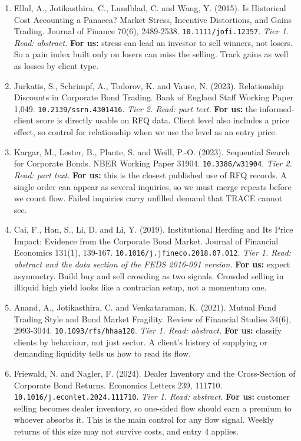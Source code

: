 \begin{enumerate}[leftmargin=*,itemsep=3pt]
\item Ellul, A., Jotikasthira, C., Lundblad, C. and Wang, Y. (2015). Is Historical Cost Accounting a Panacea? Market Stress, Incentive Distortions, and Gains Trading. Journal of Finance 70(6), 2489-2538. \nolinkurl{10.1111/jofi.12357}. \emph{Tier 1. Read: abstract.} \textbf{For us:} stress can lead an investor to sell winners, not losers. So a pain index built only on losers can miss the selling. Track gains as well as losses by client type.
\item Jurkatis, S., Schrimpf, A., Todorov, K. and Vause, N. (2023). Relationship Discounts in Corporate Bond Trading. Bank of England Staff Working Paper 1,049. \nolinkurl{10.2139/ssrn.4301416}. \emph{Tier 2. Read: part text.} \textbf{For us:} the informed-client score is directly usable on RFQ data. Client level also includes a price effect, so control for relationship when we use the level as an entry price.
\item Kargar, M., Lester, B., Plante, S. and Weill, P.-O. (2023). Sequential Search for Corporate Bonds. NBER Working Paper 31904. \nolinkurl{10.3386/w31904}. \emph{Tier 2. Read: part text.} \textbf{For us:} this is the closest published use of RFQ records. A single order can appear as several inquiries, so we must merge repeats before we count flow. Failed inquiries carry unfilled demand that TRACE cannot see.
\item Cai, F., Han, S., Li, D. and Li, Y. (2019). Institutional Herding and Its Price Impact: Evidence from the Corporate Bond Market. Journal of Financial Economics 131(1), 139-167. \nolinkurl{10.1016/j.jfineco.2018.07.012}. \emph{Tier 1. Read: abstract and the data section of the FEDS 2016-091 version.} \textbf{For us:} expect asymmetry. Build buy and sell crowding as two signals. Crowded selling in illiquid high yield looks like a contrarian setup, not a momentum one.
\item Anand, A., Jotikasthira, C. and Venkataraman, K. (2021). Mutual Fund Trading Style and Bond Market Fragility. Review of Financial Studies 34(6), 2993-3044. \nolinkurl{10.1093/rfs/hhaa120}. \emph{Tier 1. Read: abstract.} \textbf{For us:} classify clients by behaviour, not just sector. A client's history of supplying or demanding liquidity tells us how to read its flow.
\item Friewald, N. and Nagler, F. (2024). Dealer Inventory and the Cross-Section of Corporate Bond Returns. Economics Letters 239, 111710. \nolinkurl{10.1016/j.econlet.2024.111710}. \emph{Tier 1. Read: abstract.} \textbf{For us:} customer selling becomes dealer inventory, so one-sided flow should earn a premium to whoever absorbs it. This is the main control for any flow signal. Weekly returns of this size may not survive costs, and entry 4 applies.

\end{enumerate}

